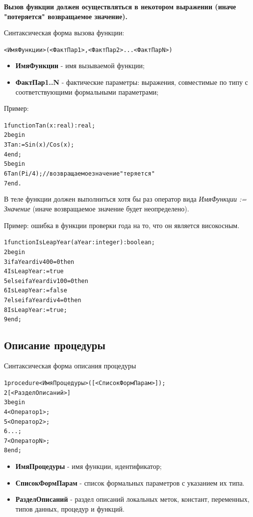 \documentclass{beamer}
\begin{document}
\begin{frame}[fragile]
\textbf{Вызов функции должен осуществляться в некотором выражении (иначе "потеряется" возвращаемое значение).}

Синтаксическая форма вызова функции:
\begin{alltt}
<ИмяФункции>(<ФактПар1>,<ФактПар2>...<ФактПарN>)
\end{alltt}
\begin{itemize}
\item \textbf{ИмяФункции} - имя вызываемой функции;
\item \textbf{ФактПар1..N} - фактические параметры: выражения, совместимые по типу с соответствующими формальными параметрами;
\end{itemize}
Пример:
\begin{alltt}
1 function Tan(x: real):real;
2 begin
3   Tan := Sin(x)/Cos(x);
4 end;
5 begin
6   Tan(Pi/4); //возвращаемое значение "теряется"
7 end.
\end{alltt}
\end{frame}

\begin{frame}[fragile]
В теле функции должен выполниться хотя бы раз оператор вида \textit{ИмяФункции := Значение} (иначе возвращаемое значение будет неопределено).

Пример: ошибка в функции проверки года на то, что он является високосным.
\begin{alltt}
1 function IsLeapYear(aYear: integer):boolean;
2 begin
3   if aYear div 400 = 0 then
4      IsLeapYear := true
5   else if aYear div 100 = 0 then
6      IsLeapYear := false
7   else if aYear div 4 = 0 then
8      IsLeapYear := true;
9 end;
\end{alltt}
\end{frame}

\subsection{Описание процедуры}
\begin{frame}[fragile]{Синтаксическая форма описания процедуры}
\begin{alltt}
1 procedure <ИмяПроцедуры>([<СписокФормПарам>]);
2 [<РазделОписаний>]
3 begin
4   <Оператор 1>;
5   <Оператор 2>;
6   ...;
7   <Оператор N>;
8 end;
\end{alltt}
\begin{itemize}
\item \textbf{ИмяПроцедуры} - имя функции, идентификатор;
\item \textbf{СписокФормПарам} - список формальных параметров с указанием их типа.
\item \textbf{РазделОписаний} - раздел описаний локальных меток, констант, переменных, типов данных, процедур и функций.
\end{itemize}
\end{frame}
\end{document}

